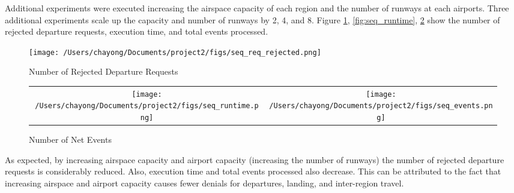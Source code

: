 Additional experiments were executed increasing the airspace capacity of each region and
the number of runways at each airports. Three additional experiments scale up the capacity
and number of runways by 2, 4, and 8. Figure \ref{fig:seq_req_rejected}, \ref{fig:seq_runtime}, \ref{fig:seq_events} show the number of rejected
departure requests, execution time, and total events processed.



\begin{figure} [htd]
\centering
\texttt{[image: /Users/chayong/Documents/project2/figs/seq\_req\_rejected.png]}
\caption{Number of Rejected Departure Requests}
\label{fig:seq_req_rejected}
\end{figure}

\begin{figure}
\centering
\begin{tabular}{cc}
\begin{minipage}{200pt}
\texttt{[image: /Users/chayong/Documents/project2/figs/seq\_runtime.png]}
\caption{Sequential Execution Time}
\label{fig:seq_runtime}
\end{minipage}
&
\begin{minipage}{200pt}
\texttt{[image: /Users/chayong/Documents/project2/figs/seq\_events.png]}
\caption{Number of Net Events}
\label{fig:seq_events}
\end{minipage}
\end{tabular}
\end{figure}



As expected, by increasing airspace capacity and airport capacity (increasing the number of
runways) the number of rejected departure requests is considerably reduced. Also, execution
time and total events processed also decrease. This can be attributed to the fact that increasing
airspace and airport capacity causes fewer denials for departures, landing, and inter-region
travel.